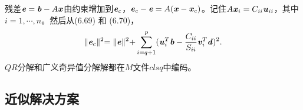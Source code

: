 残差$ \textbf{\textit{e}} = \textbf{\textit{b}}-A\textbf{\textit{x}}$由约束增加到$\textbf{\textit{e}}_{c}$，$\textbf{\textit{e}}_{c} - \textbf{\textit{e}} = A(\textbf{\textit{x}} -\textbf{\textit{x}}_{c}) $。记住$ A\textbf{\textit{x}}_{i} = C_{ii}\textbf{\textit{u}}_{ii}$，其中$i=1,\cdots,n$。然后从(6.69) 和 (6.70)，
\begin{align*}
\lVert \textbf{\textit{e}}_{c} \lVert^{2} =
\lVert \textbf{\textit{e}} \lVert^{2} +
\sum_{i=q+1}^p(\textbf{\textit{u}}^{T}_{i}\textbf{\textit{b}} -
\dfrac{C_{ii}}{S_{ii}} \textbf{\textit{v}}^{T}_{i}\textbf{\textit{d}}
)^{2}.
\end{align*}
 $QR$分解和广义奇异值分解解都在$M$文件$clsq$中编码。

 \subsection{近似解决方案}
 

